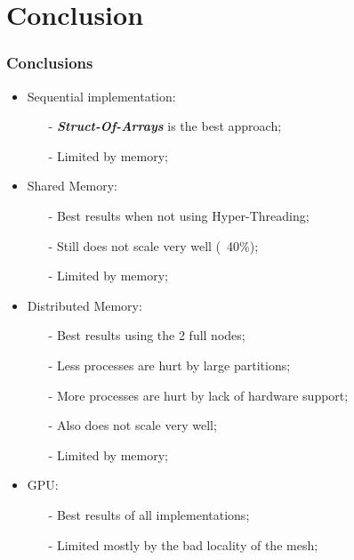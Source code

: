 \section{Conclusion}

\begin{frame}
	\frametitle{Conclusions}

	\begin{itemize}
		\item Sequential implementation:
		\begin{itemize}
			\item[-] \textbf{\itshape Struct-Of-Arrays} is the best approach;
			\item[-] Limited by memory;
		\end{itemize}
		\item Shared Memory:
		\begin{itemize}
			\item[-] Best results when not using Hyper-Threading;
			\item[-] Still does not scale very well (~40\%);
			\item[-] Limited by memory;
		\end{itemize}
		\item Distributed Memory:
		\begin{itemize}
			\item[-] Best results using the 2 full nodes;
			\item[-] Less processes are hurt by large partitions;
			\item[-] More processes are hurt by lack of hardware support;
			\item[-] Also does not scale very well;
			\item[-] Limited by memory;
		\end{itemize}
		\item GPU:
		\begin{itemize}
			\item[-] Best results of all implementations;
			\item[-] Limited mostly by the bad locality of the mesh;
		\end{itemize}
	\end{itemize}
\end{frame}

